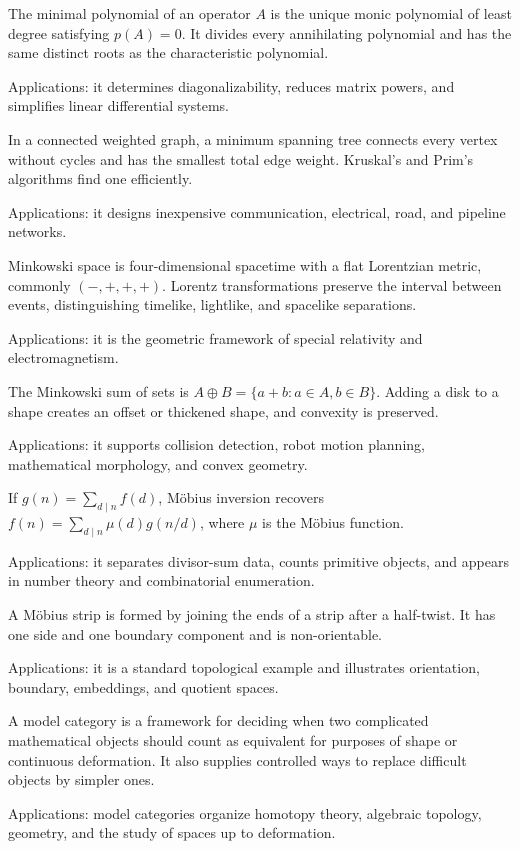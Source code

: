 The minimal polynomial of an operator $A$ is the unique monic polynomial of least degree satisfying $p(A)=0$. It divides every annihilating polynomial and has the same distinct roots as the characteristic polynomial. \par\noindent Applications: it determines diagonalizability, reduces matrix powers, and simplifies linear differential systems.

In a connected weighted graph, a minimum spanning tree connects every vertex without cycles and has the smallest total edge weight. Kruskal's and Prim's algorithms find one efficiently. \par\noindent Applications: it designs inexpensive communication, electrical, road, and pipeline networks.

Minkowski space is four-dimensional spacetime with a flat Lorentzian metric, commonly $(-,+,+,+)$. Lorentz transformations preserve the interval between events, distinguishing timelike, lightlike, and spacelike separations. \par\noindent Applications: it is the geometric framework of special relativity and electromagnetism.

The Minkowski sum of sets is $A\oplus B=\{a+b:a\in A,b\in B\}$. Adding a disk to a shape creates an offset or thickened shape, and convexity is preserved. \par\noindent Applications: it supports collision detection, robot motion planning, mathematical morphology, and convex geometry.

If $g(n)=\sum_{d\mid n}f(d)$, Möbius inversion recovers $f(n)=\sum_{d\mid n}\mu(d)g(n/d)$, where $\mu$ is the Möbius function. \par\noindent Applications: it separates divisor-sum data, counts primitive objects, and appears in number theory and combinatorial enumeration.

A Möbius strip is formed by joining the ends of a strip after a half-twist. It has one side and one boundary component and is non-orientable. \par\noindent Applications: it is a standard topological example and illustrates orientation, boundary, embeddings, and quotient spaces.

A model category is a framework for deciding when two complicated mathematical objects should count as equivalent for purposes of shape or continuous deformation. It also supplies controlled ways to replace difficult objects by simpler ones. \par\noindent Applications: model categories organize homotopy theory, algebraic topology, geometry, and the study of spaces up to deformation.


